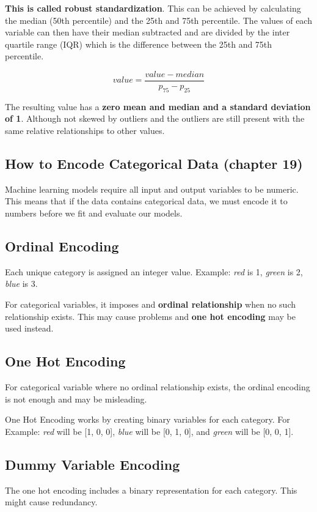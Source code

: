\documentclass{article}
\begin{document}
\noindent \textbf{This is called robust standardization}. This can be achieved by calculating the median (50th percentile) and the 25th and 75th percentile. The values of each variable can then have their median subtracted and are divided by the inter quartile range (IQR) which is the difference between the 25th and 75th percentile.

\begin{equation}
value = \frac{value - median}{p_{75} - p_{25}}
\end{equation}

The resulting value has a \textbf{zero mean and median and a standard deviation of 1}. Although not skewed by outliers and the outliers are still present with the same relative relationships to other values.

\subsection{How to Encode Categorical Data (chapter 19)}
Machine learning models require all input and output variables to be numeric. This means that if the data contains categorical data, we must encode it to numbers before we fit and evaluate our models.

\subsection*{Ordinal Encoding}
Each unique category is assigned an integer value. Example: \textit{red} is 1, \textit{green} is 2, \textit{blue} is 3.

\noindent For categorical variables, it imposes and \textbf{ordinal relationship} when no such relationship exists. This may cause problems and \textbf{one hot encoding} may be used instead.

\subsection*{One Hot Encoding}
For categorical variable where no ordinal relationship exists, the ordinal encoding is not enough and may be misleading.

\noindent One Hot Encoding works by creating binary variables for each category. For Example: \textit{red} will be [1, 0, 0], \textit{blue} will be [0, 1, 0], and \textit{green} will be [0, 0, 1].

\subsection*{Dummy Variable Encoding}
The one hot encoding includes a binary representation for each category. This might cause redundancy. 
\end{document}

